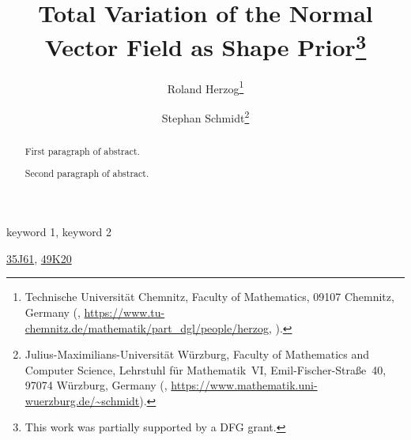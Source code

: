 \documentclass{numapde-preprint}
\title{Total Variation of the Normal Vector Field as Shape Prior\thanks{This work was partially supported by a DFG grant.}}
\subtitle{}
\author{Roland Herzog\thanks{Technische Universität Chemnitz, Faculty of Mathematics, 09107 Chemnitz, Germany (\email{roland.herzog@mathematik.tu-chemnitz.de}, \url{https://www.tu-chemnitz.de/mathematik/part_dgl/people/herzog}, \orcid{0000-0003-2164-6575}).}
\and
Stephan Schmidt\thanks{Julius-Maximilians-Universität Würzburg, Faculty of Mathematics and Computer Science, Lehrstuhl für Mathematik~VI, Emil-Fischer-Straße~40, 97074 Würzburg, Germany (\email{stephan.schmidt@mathematik.uni-wuerzburg.de}, \url{https://www.mathematik.uni-wuerzburg.de/\~schmidt}).}}
\begin{document}
\maketitle

\begin{abstract}
First paragraph of abstract.

Second paragraph of abstract.\end{abstract}

\begin{keywords}
keyword 1, keyword 2\end{keywords}

\begin{AMS}
\href{https://mathscinet.ams.org/msc/msc2010.html?t=35J61}{35J61}, \href{https://mathscinet.ams.org/msc/msc2010.html?t=49K20}{49K20}
\end{AMS}



\printbibliography
\end{document}
